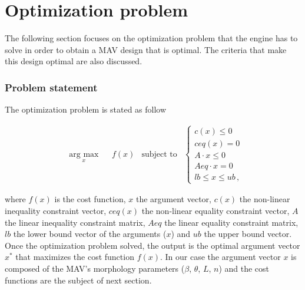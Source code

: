\section{Optimization problem}
\label{sec:optimization_problem}
The following section focuses on the optimization problem that the engine has to
solve in order to obtain a MAV design that is optimal. The criteria that make
this design optimal are also discussed.

\subsubsection{Problem statement}
\label{sec:problem}
 The optimization problem is stated as follow

\begin{equation}
  \label{opt_pb}
  \begin{aligned}
    & \underset{x}{\text{arg max}}
    & & f(x) &\text{subject to} &
    \begin{cases}
      c(x) \leq 0 \\
      ceq(x) = 0 \\
      A\cdot x \leq 0 \\
      Aeq \cdot x = 0 \\
      lb \leq x \leq ub\, ,
    \end{cases}
  \end{aligned}
\end{equation}

where $f(x)$ is the cost function, $x$ the argument vector, $c(x)$
the non-linear inequality constraint vector, $ceq(x)$ the non-linear equality
constraint vector, $A$ the linear inequality constraint matrix, $Aeq$ the linear
equality constraint matrix, $lb$ the lower bound vector of the arguments ($x$)
and $ub$ the upper bound vector.\\
Once the optimization problem solved, the output is the optimal argument vector
$x^*$ that maximizes the cost function $f(x)$. In our case the argument vector
$x$ is composed of the MAV's morphology parameters ($\beta$, $\theta$, $L$, $n$)
and the cost functions are the subject of next section.

